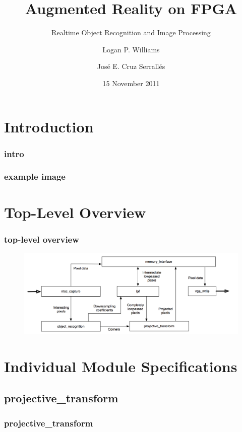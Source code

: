 \documentclass{beamer}
\title[Augmented Reality on FPGA]{Augmented Reality on FPGA}
\subtitle{Realtime Object Recognition and Image Processing}
\author{Logan P. Williams \and Jos\'{e} E. Cruz Serrall\'{e}s}
\date{15 November 2011}
\begin{document}
\begin{frame}
	\titlepage
\end{frame}

\section{Introduction}
\begin{frame}
	\frametitle{intro}
\end{frame}

\begin{frame}
	\frametitle{example image}
	\begin{figure}
		\centering
	\end{figure}
\end{frame}

\section{Top-Level Overview}
\begin{frame}
	\frametitle{top-level overview}
	\begin{figure}
		\centering
		\includegraphics[width=\textwidth]{../proposal/simplified_block_diagram.png}
	\end{figure}
\end{frame}

\section{Individual Module Specifications}
\subsection{projective\_transform}
\begin{frame}
	\frametitle{projective\_transform}
\end{frame}
\end{document}
